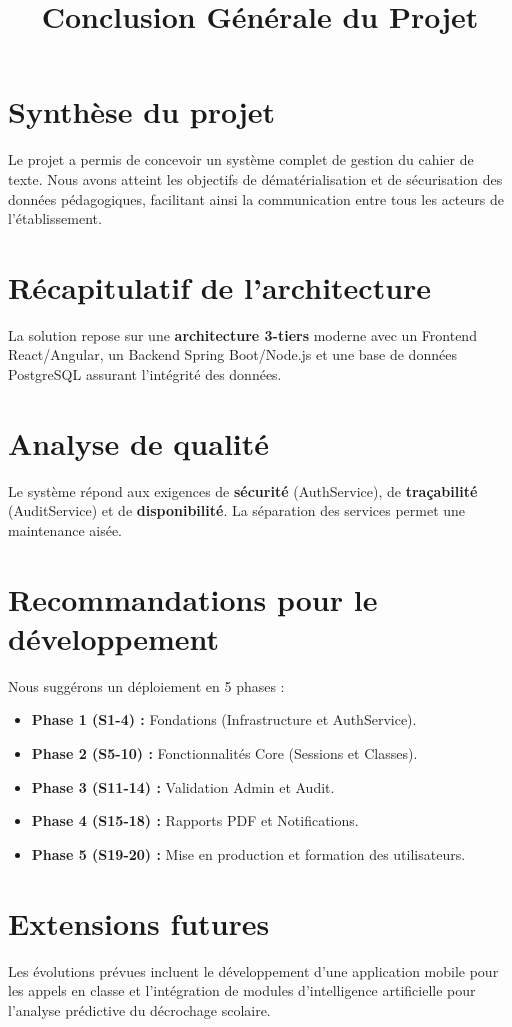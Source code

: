 \documentclass[12pt,a4paper]{article}
\title{Conclusion Générale du Projet}
\date{}
\begin{document}
\maketitle

\section{Synthèse du projet}
Le projet a permis de concevoir un système complet de gestion du cahier de texte. Nous avons atteint les objectifs de dématérialisation et de sécurisation des données pédagogiques, facilitant ainsi la communication entre tous les acteurs de l'établissement.

\section{Récapitulatif de l’architecture}
La solution repose sur une \textbf{architecture 3-tiers} moderne avec un Frontend React/Angular, un Backend Spring Boot/Node.js et une base de données PostgreSQL assurant l'intégrité des données.

\section{Analyse de qualité}
Le système répond aux exigences de \textbf{sécurité} (AuthService), de \textbf{traçabilité} (AuditService) et de \textbf{disponibilité}. La séparation des services permet une maintenance aisée.

\section{Recommandations pour le développement}
Nous suggérons un déploiement en 5 phases :
\begin{itemize}
    \item \textbf{Phase 1 (S1-4) :} Fondations (Infrastructure et AuthService).
    \item \textbf{Phase 2 (S5-10) :} Fonctionnalités Core (Sessions et Classes).
    \item \textbf{Phase 3 (S11-14) :} Validation Admin et Audit.
    \item \textbf{Phase 4 (S15-18) :} Rapports PDF et Notifications.
    \item \textbf{Phase 5 (S19-20) :} Mise en production et formation des utilisateurs.
\end{itemize}

\section{Extensions futures}
Les évolutions prévues incluent le développement d'une application mobile pour les appels en classe et l'intégration de modules d'intelligence artificielle pour l'analyse prédictive du décrochage scolaire.
\end{document}
